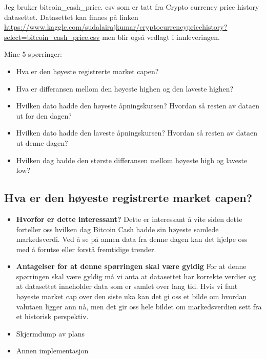 \documentclass{article}
\begin{document}
    Jeg bruker bitcoin\_cash\_price. csv som er tatt fra Crypto currency price history datasettet. Datasettet kan finnes på linken \url{https://www.kaggle.com/sudalairajkumar/cryptocurrencypricehistory?select=bitcoin_cash_price.csv} men blir også vedlagt i innleveringen. \newline

    \noindent Mine 5 spørringer:
    \begin{itemize} 
        \item Hva er den høyeste registrerte market capen?
        \item Hva er differansen mellom den høyeste highen og den laveste highen?
        \item Hvilken dato hadde den høyeste åpningskursen? Hvordan så resten av dataen ut for den dagen?
        \item Hvilken dato hadde den laveste åpningskursen? Hvordan så resten av dataen ut denne dagen?
        \item Hvilken dag hadde den største differansen mellom høyeste high og laveste low?
    \end{itemize}

    \clearpage

    \subsection{Hva er den høyeste registrerte market capen?}
    \begin{itemize}
        \item \textbf{Hvorfor er dette interessant?} \newline
        Dette er interessant å vite siden dette forteller oss hvilken dag Bitcoin Cash hadde sin høyeste samlede markedsverdi. 
        Ved å se på annen data fra denne dagen kan det hjelpe oss med å forutse eller forstå fremtidige trender.
        
        \item \textbf{Antagelser for at denne spørringen skal være gyldig} \newline
        For at denne spørringen skal være gyldig må vi anta at datasettet har korrekte verdier og at datasettet
        inneholder data som er samlet over lang tid. Hvis vi fant høyeste market cap over den siste uka kan det gi oss et bilde
        om hvordan valutaen ligger ann nå, men det gir oss hele bildet om markedsverdien sett fra et historisk perspektiv.
        
        \item Skjermdump av plans
        
        \item Annen implementasjon

    \end{itemize}
\end{document}
